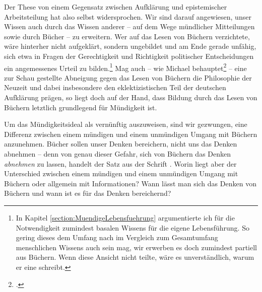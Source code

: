 Der These von einem Gegensatz zwischen Aufklärung und epistemischer
Arbeitsteilung hat  also selbst widersprochen. Wir sind
darauf angewiesen, unser Wissen auch durch das Wissen anderer -- auf dem Wege
mündlicher Mitteilungen sowie durch Bücher -- zu erweitern.
Wer auf das Lesen von Büchern verzichtete, wäre hinterher nicht aufgeklärt,
sondern ungebildet und am Ende gerade unfähig, sich etwa in Fragen der
Gerechtigkeit und Richtigkeit politischer Entscheidungen ein angemessenes Urteil
zu bilden.\footnote{In Kapitel \ref{section:MuendigeLebensfuehrung}
argumentierte ich für die Notwendigkeit zumindest basalen Wissens für die
eigene Lebensführung. So gering dieses dem Umfang nach im Vergleich zum
Gesamtumfang menschlichen Wissens auch sein mag, wir erwerben es doch zumindest
partiell aus Büchern. Wenn  diese Ansicht nicht teilte,
wäre es unverständlich, warum er eine  schreibt.} Mag auch -- wie Michael 
behauptet\footcite[Vgl.][18--23]{Albrecht:KantsKritikderhistorischenErkenntnis--einBekenntniszuWolff?1982}
-- eine zur Schau gestellte Abneigung gegen das Lesen von Büchern die
Philosophie der Neuzeit und dabei insbesondere den eklektizistischen Teil der
deutschen Aufklärung prägen, so liegt doch auf der Hand, dass Bildung durch
das Lesen von Büchern letztlich grundlegend für Mündigkeit ist.

Um das Mündigkeitsideal als vernünftig auszuweisen, sind wir gezwungen, eine
Differenz zwischen einem mündigen und einem unmündigen Umgang mit Büchern
anzunehmen. Bücher sollen unser Denken bereichern, nicht uns das Denken abnehmen
-- denn von genau dieser Gefahr, sich von Büchern das Denken \emph{abnehmen} zu
lassen, handelt der Satz aus der Schrift . Worin
liegt aber der Unterschied zwischen einem mündigen und einem unmündigen Umgang
mit Büchern oder allgemein mit Informationen? Wann lässt man sich das Denken von
Büchern  und wann ist es für das Denken bereichernd?

